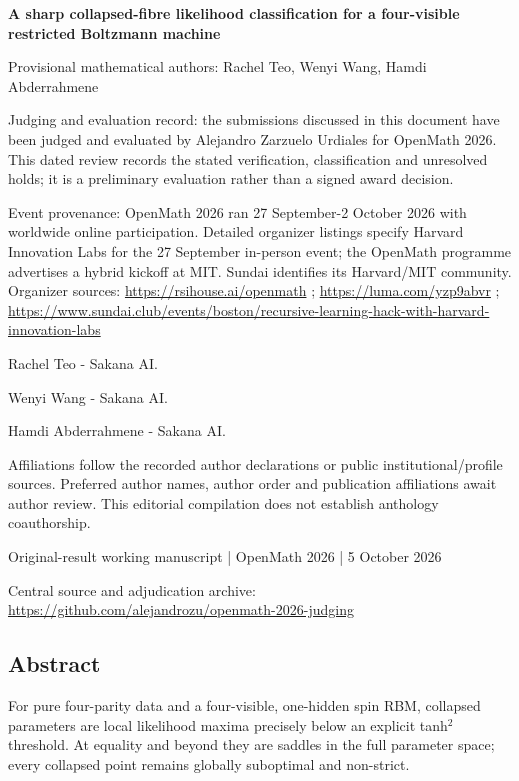 \documentclass[11pt,a4paper]{article}
\begin{document}
{\LARGE\bfseries A sharp collapsed-fibre likelihood classification for a four-visible restricted Boltzmann machine\par}\medskip
{\small Provisional mathematical authors: Rachel Teo, Wenyi Wang, Hamdi Abderrahmene\par}\medskip
{\small Judging and evaluation record: the submissions discussed in this document have been judged and evaluated by Alejandro Zarzuelo Urdiales for OpenMath 2026. This dated review records the stated verification, classification and unresolved holds; it is a preliminary evaluation rather than a signed award decision.\par}

{\small Event provenance: OpenMath 2026 ran 27 September-2 October 2026 with worldwide online participation. Detailed organizer listings specify Harvard Innovation Labs for the 27 September in-person event; the OpenMath programme advertises a hybrid kickoff at MIT. Sundai identifies its Harvard/MIT community. Organizer sources: \url{https://rsihouse.ai/openmath} ; \url{https://luma.com/yzp9abvr} ; \url{https://www.sundai.club/events/boston/recursive-learning-hack-with-harvard-innovation-labs}\par}

{\small Rachel Teo  -  Sakana AI.\par}

{\small Wenyi Wang  -  Sakana AI.\par}

{\small Hamdi Abderrahmene  -  Sakana AI.\par}

{\small Affiliations follow the recorded author declarations or public institutional/profile sources. Preferred author names, author order and publication affiliations await author review. This editorial compilation does not establish anthology coauthorship.\par}

{\small Original-result working manuscript | OpenMath 2026 | 5 October 2026\par}\medskip
{\small Central source and adjudication archive: \url{https://github.com/alejandrozu/openmath-2026-judging}\par}

\subsection{Abstract}
For pure four-parity data and a four-visible, one-hidden spin RBM, collapsed parameters are local likelihood maxima precisely below an explicit tanh\ensuremath{^2} threshold. At equality and beyond they are saddles in the full parameter space; every collapsed point remains globally suboptimal and non-strict.
\end{document}
